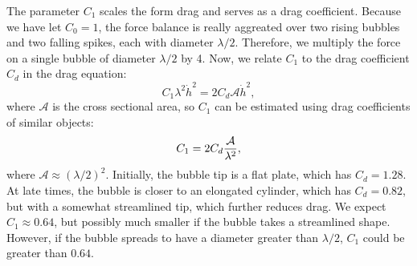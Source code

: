 The parameter $C_1$ scales the form drag and serves as a drag coefficient.  
Because we have let $C_0 = 1$, the force balance is really aggreated over two rising bubbles and two falling spikes, each with diameter $\lambda / 2$.
Therefore, we multiply the force on a single bubble of diameter $\lambda/2$ by 4.
Now, we relate $C_1$ to the drag coefficient $C_d$ in the drag equation:
\begin{equation}
	C_1 \lambda^2 \dot{h}^2 = 2 C_d \mathcal{A} \dot{h}^2,
\end{equation}
where $\mathcal{A}$ is the cross sectional area,
so $C_1$ can be estimated using drag coefficients of similar objects:
\begin{equation} \elabel{prior_c1}
C_1 = 2 C_d \frac{
	\mathcal{A}}{\lambda^2},
\end{equation}
where $\mathcal{A} \approx (\lambda/2)^2$.
Initially, the bubble tip is a flat plate, which has $C_d = 1.28$.
At late times, the bubble is closer to an elongated cylinder, which has $C_d = 0.82$, but with a somewhat streamlined tip, which further reduces drag.
We expect $C_1 \approx 0.64$, but possibly much smaller if the bubble takes a streamlined shape.
However, if the bubble spreads to have a diameter greater than $\lambda / 2$, $C_1$ could be greater than $0.64$.

